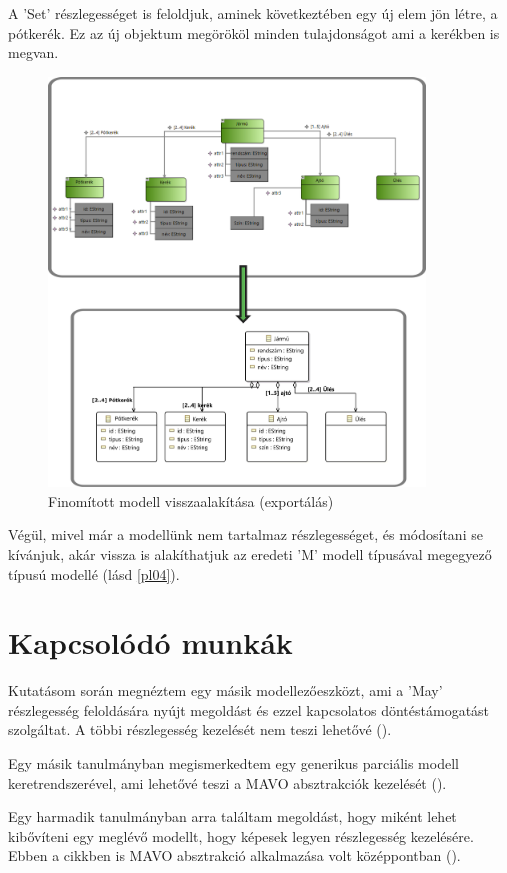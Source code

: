 A 'Set' részlegességet is feloldjuk, aminek következtében egy új elem jön létre, a pótkerék. Ez az új objektum megörököl minden tulajdonságot ami a kerékben is megvan.
\begin{figure}[!ht]
	\centering
	\includegraphics[width=100mm]{figures/pl04.pdf}
	\caption{Finomított modell visszaalakítása (exportálás)} 
	\label{pl04}
\end{figure}
\par
Végül, mivel már a modellünk nem tartalmaz részlegességet, és módosítani se kívánjuk, akár vissza is alakíthatjuk az eredeti 'M' modell típusával megegyező típusú modellé (lásd \autoref{pl04}).

\section{Kapcsolódó munkák}
Kutatásom során megnéztem egy másik modellezőeszközt, ami a 'May' részlegesség feloldására nyújt megoldást és ezzel kapcsolatos döntéstámogatást szolgáltat. A többi részlegesség kezelését nem teszi lehetővé (\cite{Michalis}). 
\par
Egy másik tanulmányban megismerkedtem egy generikus parciális modell keretrendszerével, ami lehetővé teszi a MAVO absztrakciók kezelését (\cite{SalayR}).
\par
Egy harmadik tanulmányban arra találtam megoldást, hogy miként lehet kibővíteni egy meglévő modellt, hogy képesek legyen részlegesség kezelésére. Ebben a cikkben is MAVO absztrakció alkalmazása volt középpontban (\cite{Salay}).
